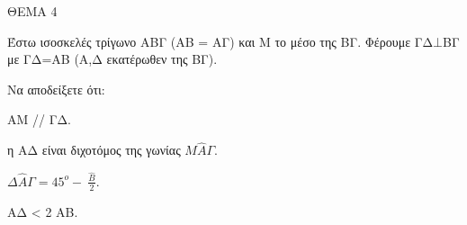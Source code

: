 
ΘΕΜΑ 4

Έστω ισοσκελές τρίγωνο ΑΒΓ (ΑΒ = ΑΓ) και Μ το μέσο της ΒΓ. Φέρουμε ΓΔ$\bot$ΒΓ με ΓΔ=ΑΒ (Α,Δ εκατέρωθεν της ΒΓ).

Nα αποδείξετε ότι:

\begin{alist}
\item ΑΜ // ΓΔ. 

\item η ΑΔ είναι διχοτόμος της γωνίας $Μ\widehat{Α}\Gamma$. 

\item $\Delta\widehat{Α}\Gamma = 45^{ο} - \ \frac{\widehat{Β}}{2}$. 

\item ΑΔ \textless{} 2 ΑΒ. 


\end{alist}
